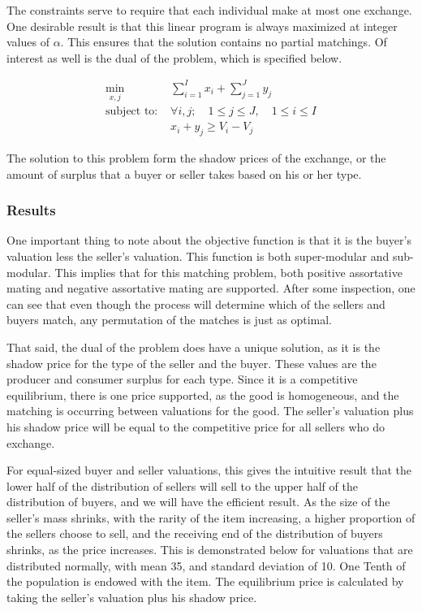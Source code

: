 \documentclass[12pt, letterpaper]{paper}
\begin{document}
The constraints serve to require that each individual make at most one
exchange. One desirable result is that this linear program is always
maximized at integer values of $\alpha$. This ensures that the solution
contains no partial matchings.  Of interest as well is the dual of
the problem, which is specified below.

\begin{align*}
\min_{x,j} & \sum_{i=1}^I x_i + \sum_{j=1}^J y_j \\
\text{subject to: } & \forall i,j; \quad 1 \leq j \leq J, \quad 1 \le i \leq I\\
& x_i + y_j \geq V_i - V_j 
\end{align*}

The solution to this problem form the shadow prices of the exchange,
or the amount of surplus that a buyer or seller takes based on his or
her type. 

\subsubsection{Results}
\label{sec-2-1-1}
One important thing to note about the objective function is that it is
the buyer's valuation less the seller's valuation. This function
is both super-modular and sub-modular. This implies that for this
matching problem, both positive assortative mating and negative
assortative mating are supported. After some inspection, one can see
that even though the process will determine which of the sellers and
buyers match, any permutation of the matches is just as optimal.

That said, the dual of the problem does have a unique solution, as it is
the shadow price for the type of the seller and the buyer. These
values are the producer and consumer surplus for each type. Since it is
a competitive equilibrium, there is one price supported, as the good
is homogeneous, and the matching is occurring between valuations for the
good. The seller's valuation plus his shadow price will be equal to
the competitive price for all sellers who do exchange. 

For equal-sized buyer and seller valuations, this gives the intuitive
result that the lower half of the distribution of sellers will sell to
the upper half of the distribution of buyers, and we will have the
efficient result. As the size of the seller's mass shrinks, with the
rarity of the item increasing, a higher proportion of the sellers
choose to sell, and the receiving end of the distribution of buyers
shrinks, as the price increases. This is demonstrated below for
valuations that are distributed normally, with mean 35, and standard
deviation of 10. One Tenth of the population is endowed with the item.
The equilibrium price is calculated by taking the seller's valuation
plus his shadow price.
\end{document}

